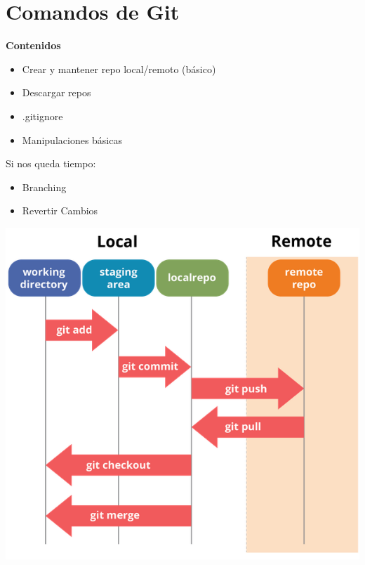 \documentclass{beamer}
\begin{document}
\section{Comandos de Git}
	\begin{frame}
		\textbf{Contenidos}\\
		\vspace{.5cm}
		\begin{itemize}
			\item Crear y mantener repo local/remoto (básico)
			\item Descargar repos
			\item .gitignore
			\item Manipulaciones básicas
		\end{itemize}
		\vspace{.5cm}
		Si nos queda tiempo:
		\vspace{.25cm} 
		\begin{itemize}
			\item Branching
			\item Revertir Cambios
		\end{itemize}
		
		\end{frame}
	\begin{frame}
		\begin{center}
			\includegraphics[scale=.3]{img/git_diagram.png}
		\end{center}
	\end{frame}
\end{document}
